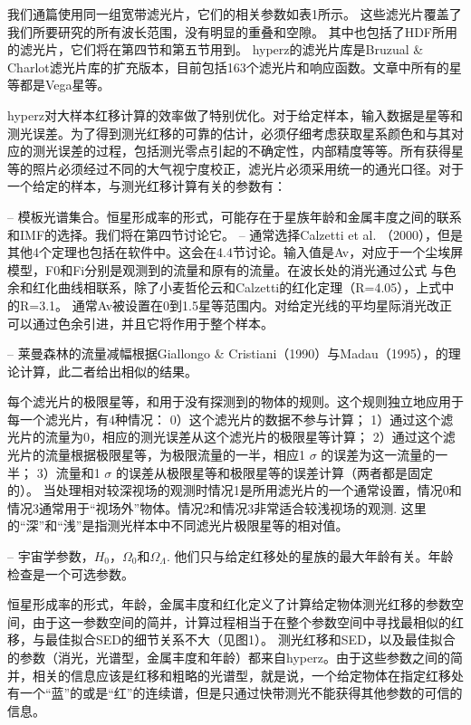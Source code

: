 \documentclass[8pt,a4paper,openany,twoside]{book}
\begin{document}
我们通篇使用同一组宽带滤光片，它们的相关参数如表1所示。 这些滤光片覆盖了我们所要研究的所有波长范围，没有明显的重叠和空隙。
其中也包括了HDF所用的滤光片，它们将在第四节和第五节用到。
hyperz的滤光片库是Bruzual \& Charlot滤光片库的扩充版本，目前包括163个滤光片和响应函数。文章中所有的星等都是Vega星等。
 
hyperz对大样本红移计算的效率做了特别优化。对于给定样本，输入数据是星等和测光误差。为了得到测光红移的可靠的估计，必须仔细考虑获取星系颜色和与其对应的测光误差的过程，包括测光零点引起的不确定性，内部精度等等。所有获得星等的照片必须经过不同的大气视宁度校正，滤光片必须采用统一的通光口径。对于一个给定的样本，与测光红移计算有关的参数有：
 
-- 模板光谱集合。恒星形成率的形式，可能存在于星族年龄和金属丰度之间的联系和IMF的选择。我们将在第四节讨论它。
-- 通常选择Calzetti et al. （2000），但是其他4个定理也包括在软件中。这会在4.4节讨论。输入值是Av，对应于一个尘埃屏模型，F0和Fi分别是观测到的流量和原有的流量。在波长处的消光通过公式
与色余和红化曲线相联系，除了小麦哲伦云和Calzetti的红化定理（R=4.05），上式中的R=3.1。
通常Av被设置在0到1.5星等范围内。对给定光线的平均星际消光改正可以通过色余引进，并且它将作用于整个样本。
 
-- 莱曼森林的流量减幅根据Giallongo \& Cristiani（1990）与Madau（1995），的理论计算，此二者给出相似的结果。
 
每个滤光片的极限星等，和用于没有探测到的物体的规则。这个规则独立地应用于每一个滤光片，有4种情况：
0）这个滤光片的数据不参与计算；
1）通过这个滤光片的流量为0，相应的测光误差从这个滤光片的极限星等计算；
2）通过这个滤光片的流量根据极限星等，为极限流量的一半，相应1 $\sigma $ 的误差为这一流量的一半；
3）流量和1 $\sigma $ 的误差从极限星等和极限星等的误差计算（两者都是固定的）。
当处理相对较深视场的观测时情况1是所用滤光片的一个通常设置，情况0和情况3通常用于“视场外”物体。情况2和情况3非常适合较浅视场的观测.
这里的“深”和“浅”是指测光样本中不同滤光片极限星等的相对值。
 
-- 宇宙学参数，$H_0$，$\Omega_0$和$\Omega_\Lambda$.
他们只与给定红移处的星族的最大年龄有关。年龄检查是一个可选参数。
 
恒星形成率的形式，年龄，金属丰度和红化定义了计算给定物体测光红移的参数空间，由于这一参数空间的简并，计算过程相当于在整个参数空间中寻找最相似的红移，与最佳拟合SED的细节关系不大（见图1）。
测光红移和SED，以及最佳拟合的参数（消光，光谱型，金属丰度和年龄）都来自hyperz。由于这些参数之间的简并，相关的信息应该是红移和粗略的光谱型，就是说，一个给定物体在指定红移处有一个“蓝”的或是“红”的连续谱，但是只通过快带测光不能获得其他参数的可信的信息。
 
\end{document}
